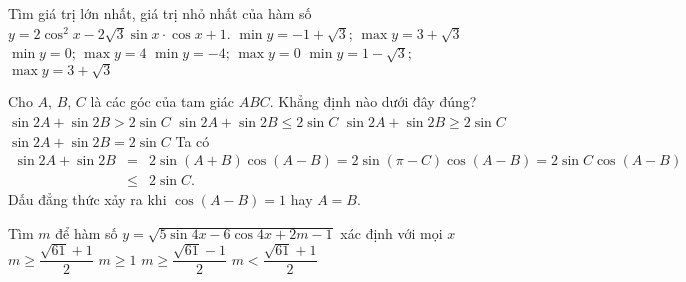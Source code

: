 \begin{ex}%
Tìm giá trị lớn nhất, giá trị nhỏ nhất của hàm số $y=2 \cos ^2 x-2 \sqrt{3} \sin x \cdot \cos x+1$.
\choice
{\True $\min y=-1+\sqrt{3}$; $\max y=3+\sqrt{3}$}
{$\min y=0$; $ \max y=4$}
{$\min y=-4$; $\max y=0$}
{$\min y=1-\sqrt{3}$; $ \max y=3+\sqrt{3}$}
\end{ex}

\begin{ex}%
Cho $A$, $B$, $C$ là các góc của tam giác $ABC$. Khẳng định nào dưới đây đúng?
\choice
{$\sin 2A+\sin 2B>2\sin C$}
{\True $\sin 2A+\sin 2B\le 2\sin C$}
{$\sin 2A+\sin 2B\ge 2\sin C$}
{$\sin 2A+\sin 2B=2\sin C$}
\loigiai
{
Ta có
\allowdisplaybreaks
\begin{eqnarray*}
\sin 2A+\sin 2B &=& 2\sin (A+B)\cos (A-B) = 2\sin (\pi-C)\cos(A-B) = 2\sin C\cos\left(A-B\right)\\
&\le& 2\sin C.
\end{eqnarray*}
Dấu đẳng thức xảy ra khi $\cos \left( A-B \right)=1$ hay $A=B$.
}
\end{ex}

\begin{ex}%
Tìm $m$ để hàm số $y=\sqrt{5\sin 4x-6\cos 4x+2m-1}$ xác định với mọi $x$
\choice
{\True $m \geq \dfrac{\sqrt{61}+1}{2}$}
{$m \geq 1$}
{$m \geq \dfrac{\sqrt{61}-1}{2}$}
{$m<\dfrac{\sqrt{61}+1}{2}$}
\end{ex}

